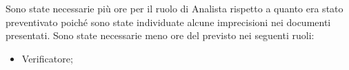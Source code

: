 Sono state necessarie più ore per il ruolo di Analista rispetto a quanto era stato preventivato poiché sono state individuate alcune imprecisioni nei documenti presentati.
\newline
Sono state necessarie meno ore del previsto nei seguenti ruoli:
\begin{itemize}
	\item Verificatore;
\end{itemize}

